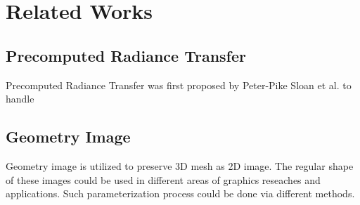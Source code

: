\section{Related Works}

\subsection{Precomputed Radiance Transfer}
Precomputed Radiance Transfer was first proposed by Peter-Pike Sloan et al.\cite{sloan2002precomputed} to handle 

\subsection{Geometry Image}
Geometry image\cite{gu2002geometry} is utilized to preserve 3D mesh as 2D image. The regular shape of these images could be used in different areas of graphics reseaches and applications. Such parameterization process could be done via different methods\cite{gu2002geometry,sinha2016deep}. 


